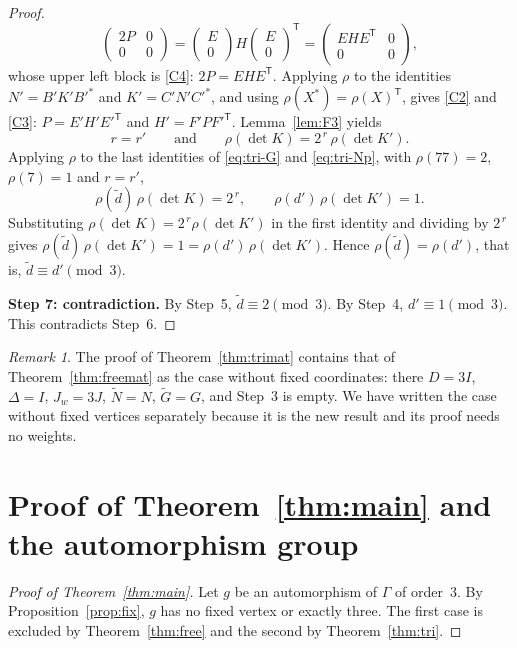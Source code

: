 \documentclass[11pt,a4paper]{article}
\theoremstyle{remark}
\newtheorem{remark}[theorem]{Remark}
\newcommand{\tp}{\mathsf{T}}
\newcommand{\tN}{\widetilde{N}}
\newcommand{\tG}{\widetilde{G}}
\newcommand{\td}{\widetilde{d}}
\newcommand{\Jw}{J_w}
\begin{document}
\begin{proof}
\[\begin{pmatrix}2P&0\\0&0\end{pmatrix}=\begin{pmatrix}E\\0\end{pmatrix}H\begin{pmatrix}E\\0\end{pmatrix}^{\tp}
=\begin{pmatrix}EHE^{\tp}&0\\0&0\end{pmatrix},
\]
whose upper left block is \ref{C4}: $2P=EHE^{\tp}$. Applying $\rho$ to the identities $N'=B'K'B'^*$ and
$K'=C'N'C'^*$, and using $\rho(X^*)=\rho(X)^{\tp}$, gives \ref{C2} and \ref{C3}: $P=E'H'E'^{\tp}$ and
$H'=F'PF'^{\tp}$. Lemma~\ref{lem:F3} yields
\[
r=r'\qquad\text{and}\qquad\rho(\det K)=2^{\,r}\,\rho(\det K').
\]
Applying $\rho$ to the last identities of \eqref{eq:tri-G} and \eqref{eq:tri-Np}, with $\rho(77)=2$, $\rho(7)=1$ and
$r=r'$,
\[
\rho(\td)\,\rho(\det K)=2^{\,r},\qquad\rho(d')\,\rho(\det K')=1 .
\]
Substituting $\rho(\det K)=2^{\,r}\rho(\det K')$ in the first identity and dividing by $2^{\,r}$ gives
$\rho(\td)\,\rho(\det K')=1=\rho(d')\,\rho(\det K')$. Hence $\rho(\td)=\rho(d')$, that is, $\td\equiv d'\pmod3$.

\medskip\noindent\textbf{Step 7: contradiction.}
By Step~5, $\td\equiv2\pmod3$. By Step~4, $d'\equiv1\pmod3$. This contradicts Step~6.
\end{proof}

\begin{remark}
The proof of Theorem~\ref{thm:trimat} contains that of Theorem~\ref{thm:freemat} as the case without fixed
coordinates: there $D=3I$, $\Delta=I$, $\Jw=3J$, $\tN=N$, $\tG=G$, and Step~3 is empty. We have written the case
without fixed vertices separately because it is the new result and its proof needs no weights.
\end{remark}

\section{Proof of Theorem~\ref{thm:main} and the automorphism group}\label{sec:aut}

\begin{proof}[Proof of Theorem~\ref{thm:main}]
Let $g$ be an automorphism of $\Gamma$ of order~3. By Proposition~\ref{prop:fix}, $g$ has no fixed vertex or exactly
three. The first case is excluded by Theorem~\ref{thm:free} and the second by Theorem~\ref{thm:tri}.
\end{proof}
\end{document}

